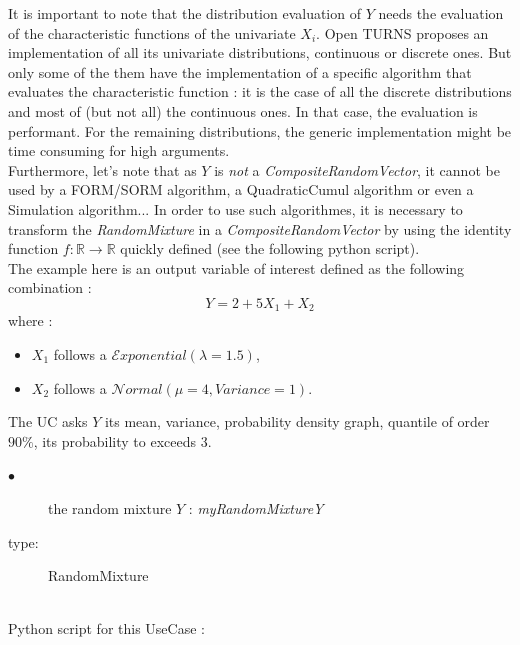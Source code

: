 It is important to note that the distribution evaluation of $Y$ needs the evaluation of  the characteristic functions of the univariate $X_i$. Open TURNS proposes an implementation of all its univariate distributions, continuous or discrete ones. But only some of the them have the implementation of a specific algorithm that evaluates the characteristic function : it is the case of all the discrete distributions and most of (but not all) the continuous ones. In that case, the evaluation is performant. For the remaining distributions, the generic implementation might be time consuming for high arguments. \\

Furthermore, let's note that as $Y$ is \emph{not} a {\itshape CompositeRandomVector}, it cannot be used by a FORM/SORM algorithm, a QuadraticCumul algorithm or even a Simulation algorithm... In order to use such algorithmes, it is necessary to transform the {\itshape RandomMixture} in a {\itshape CompositeRandomVector} by using the identity function $f : \mathbb{R} \rightarrow \mathbb{R}$ quickly defined (see the following python script).\\

The example here is an output variable of interest defined as the following combination :
$$
Y = 2 + 5X_1 + X_2
$$
where :
\begin{itemize}
\item  $X_1$ follows a $\mathcal{E}xponential(\lambda = 1.5)$,
\item  $X_2$ follows a $\mathcal{N}ormal(\mu = 4,Variance = 1)$.
\end{itemize}

The UC asks $Y$ its mean, variance, probability density graph, quantile of order $90\%$, its probability to exceeds 3.



\noindent%
{
  \begin{description}
  \item[$\bullet$] the random mixture $Y$ : {\itshape myRandomMixtureY}
  \item[type:] RandomMixture
  \end{description}
}

\textspace\\
Python script for this UseCase :

